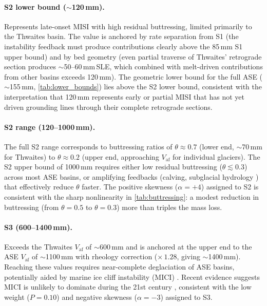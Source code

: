 \documentclass[11pt]{article}
\newcommand{\Vaf}{V_{\mathrm{af}}}
\begin{document}
\paragraph{S2 lower bound ($\sim$120\,mm).} Represents late-onset MISI with high residual buttressing, limited primarily to the Thwaites basin. The value is anchored by rate separation from S1 (the instability feedback must produce contributions clearly above the 85\,mm S1 upper bound) and by bed geometry (even partial traverse of Thwaites' retrograde section produces $\sim$50--60\,mm\,SLE, which combined with melt-driven contributions from other basins exceeds 120\,mm). The geometric lower bound for the full ASE ($\sim$155\,mm, \cref{tab:lower_bounds}) lies above the S2 lower bound, consistent with the interpretation that 120\,mm represents early or partial MISI that has not yet driven grounding lines through their complete retrograde sections.

\paragraph{S2 range (120--1000\,mm).} The full S2 range corresponds to buttressing ratios of $\theta \approx 0.7$ (lower end, $\sim$70\,mm for Thwaites) to $\theta \approx 0.2$ (upper end, approaching $\Vaf$ for individual glaciers). The S2 upper bound of 1000\,mm requires either low residual buttressing ($\theta \lesssim 0.3$) across most ASE basins, or amplifying feedbacks (calving, subglacial hydrology \citep{Dow2022}) that effectively reduce $\theta$ faster. The positive skewness ($\alpha = +4$) assigned to S2 is consistent with the sharp nonlinearity in \cref{tab:buttressing}: a modest reduction in buttressing (from $\theta = 0.5$ to $\theta = 0.3$) more than triples the mass loss.

\paragraph{S3 (600--1400\,mm).} Exceeds the Thwaites $\Vaf$ of $\sim$600\,mm and is anchored at the upper end to the ASE $\Vaf$ of $\sim$1100\,mm with rheology correction ($\times\,1.28$, giving $\sim$1400\,mm). Reaching these values requires near-complete deglaciation of ASE basins, potentially aided by marine ice cliff instability (MICI) \citep{Bassis2012, DeContoP2016}. Recent evidence suggests MICI is unlikely to dominate during the 21st century \citep{Morlighem2024, Clerc2019, Schlemm2022}, consistent with the low weight ($P = 0.10$) and negative skewness ($\alpha = -3$) assigned to S3.
\end{document}
